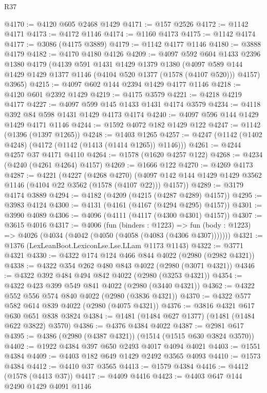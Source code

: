 \begin{lexlean}{R37}
\begin{coremodule}
@4170 := @4120 @605 @2468 @1429
@4171 := @157 @2526
@4172 := @1142 @4171
@4173 := @4172 @1146
@4174 := @1160 @4173
@4175 := @1142 @4174
@4177 := @3086 (@4175 @3889)
@4179 := @1142 @4177 @1146
@4180 := @3888 @4179
@4182 := @4170 @4180 @4126
@4209 := @4097
    @592
    @604
    @1433
    @2396
    @1380
    @4179
    (@4139
      @591
      @1431
      @1429
      @1379
      @1380
      (@4097 @589 @144 @1429 @1429 @1377 @1146 (@4104 @520 @1377 (@1578 (@4107 @520))) @4157)
      @3965)
@4215 := @4097 @602 @144 @2394 @1429 @4177 @1146
@4218 := @4120 @601 @2392 @1429
@4219 := @4175 @3579
@4221 := @4218 @4219 @4177
@4227 := @4097 @599 @145 @1433 @1431 @4174 @3579
@4234 := @4118 @392 @84 @598 @1431 @1429 @4173 @4174
@4240 := @4097 @596 @144 @1429 @1429 @4171 @1146
@4244 := @1592 @4072 @182 @1429 @122
@4247 := @1142 (@1396 (@1397 @1265))
@4248 := @1403 @1265
@4257 := @4247 (@1142 (@1402 @4248) (@4172 (@1142 (@1413 (@1414 @1265)) @1146)))
@4261 := @4244 @4257 @37 @4171 @4110
@4264 := @1578 (@1620 @4257 @122)
@4268 := @4234 (@4240 (@4261 @4264) @4157)
@4269 := @1666 @122
@4270 := @4269 @4173
@4287 := @4221
    (@4227
      (@4268 @4270)
      (@4097 @142 @144 @1429 @1429 @3562 @1146 (@4104 @22 @3562 (@1578 (@4107 @22))) @4157))
@4289 := @3179 @4174 @3889
@4294 := @4182 (@4209 (@4215 (@4287 @4289) @4157))
@4295 := @3983 @4124
@4300 := @4131 (@4161 (@4167 (@4294 @4295) @4157))
@4301 := @3990 @4089
@4306 := @4096 (@4111 (@4117 (@4300 @4301) @4157))
@4307 := @3615 @4016
@4317 := @4006
    (fun (binders : @1223) =>
    fun (body : @1223) => @4026 (@4034 (@4042 (@4050 (@4058 (@4083 (@4306 @4307)))))))
@4321 := @1376 (LexLeanBoot.LexiconLse.Lse.LLam @1173 @1143)
@4322 := @3771 @4321
@4330 := @4322 @174 @124 @466 @844 @4022 (@2980 (@2982 @4321))
@4338 := @4322 @354 @262 @480 @843 @4022 (@2980 (@3071 @4321))
@4346 := @4322 @392 @484 @494 @842 @4022 (@2980 (@3253 @4321))
@4354 := @4322 @423 @399 @549 @841 @4022 (@2980 (@3440 @4321))
@4362 := @4322 @552 @556 @574 @840 @4022 (@2980 (@3836 @4321))
@4370 := @4322 @577 @582 @614 @839 @4022 (@2980 (@4075 @4321))
@4376 := @3816 @4321 @617 @630 @651 @838 @3824
@4384 := @1481 (@1484 @627 @1377) (@1481 (@1484 @622 @3822) @3570)
@4386 := @4376 @4384 @4022
@4387 := @2981 @617
@4395 := @4386 (@2980 (@4387 @4321)) (@1514 (@1515 @630 @3824 @3570))
@4402 := @1922 @4384 @397 @650 @2493 @4017 @4094 @4021
@4403 := @1551 @4384
@4409 := @4403 @182 @649 @1429 @2492 @3565 @4093
@4410 := @1573 @4384
@4412 := @4410 @37 @3565
@4413 := @1579 @4384
@4416 := @4412 (@1578 (@4413 @37))
@4417 := @4409 @4416
@4423 := @4403 @647 @144 @2490 @1429 @4091 @1146

\end{coremodule}
\end{lexlean}
